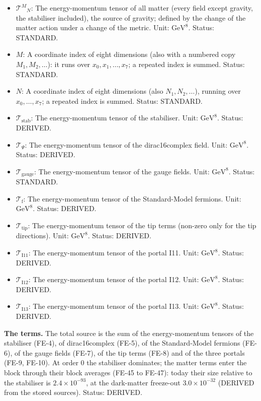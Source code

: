 \documentclass[
  10pt,
]{article}
\providecommand{\tightlist}{%
  \setlength{\itemsep}{0pt}\setlength{\parskip}{0pt}}
\begin{document}
\begin{itemize}
\tightlist
\item
  \(\mathcal{T}^M{}_N\): The energy-momentum tensor of all matter (every
  field except gravity, the stabiliser included), the source of gravity;
  defined by the change of the matter action under a change of the
  metric. Unit: \(\mathrm{GeV}^{8}\). Status: STANDARD.
\item
  \(M\): A coordinate index of eight dimensions (also with a numbered
  copy \(M_1, M_2, \dots\)): it runs over \(x_0, x_1, \dots, x_7\); a
  repeated index is summed. Status: STANDARD.
\item
  \(N\): A coordinate index of eight dimensions (also
  \(N_1, N_2, \dots\)), running over \(x_0, \dots, x_7\); a repeated
  index is summed. Status: STANDARD.
\item
  \(\mathcal{T}_{\mathrm{stab}}\): The energy-momentum tensor of the
  stabiliser. Unit: \(\mathrm{GeV}^{8}\). Status: DERIVED.
\item
  \(\mathcal{T}_\Psi\): The energy-momentum tensor of the dirac16complex
  field. Unit: \(\mathrm{GeV}^{8}\). Status: DERIVED.
\item
  \(\mathcal{T}_{\mathrm{gauge}}\): The energy-momentum tensor of the
  gauge fields. Unit: \(\mathrm{GeV}^{8}\). Status: STANDARD.
\item
  \(\mathcal{T}_{\mathrm{f}}\): The energy-momentum tensor of the
  Standard-Model fermions. Unit: \(\mathrm{GeV}^{8}\). Status: DERIVED.
\item
  \(\mathcal{T}_{\mathrm{tip}}\): The energy-momentum tensor of the tip
  terms (non-zero only for the tip directions). Unit:
  \(\mathrm{GeV}^{8}\). Status: DERIVED.
\item
  \(\mathcal{T}_{\mathrm{I11}}\): The energy-momentum tensor of the
  portal I11. Unit: \(\mathrm{GeV}^{8}\). Status: DERIVED.
\item
  \(\mathcal{T}_{\mathrm{I12}}\): The energy-momentum tensor of the
  portal I12. Unit: \(\mathrm{GeV}^{8}\). Status: DERIVED.
\item
  \(\mathcal{T}_{\mathrm{I13}}\): The energy-momentum tensor of the
  portal I13. Unit: \(\mathrm{GeV}^{8}\). Status: DERIVED.
\end{itemize}

\textbf{The terms.} The total source is the sum of the energy-momentum
tensors of the stabiliser (FE-4), of dirac16complex (FE-5), of the
Standard-Model fermions (FE-6), of the gauge fields (FE-7), of the tip
terms (FE-8) and of the three portals (FE-9, FE-10). At order 0 the
stabiliser dominates; the matter terms enter the block through their
block averages (FE-45 to FE-47): today their size relative to the
stabiliser is \(2.4\times10^{-93}\), at the dark-matter freeze-out
\(3.0\times10^{-32}\) (DERIVED from the stored sources). Status:
DERIVED.
\end{document}
